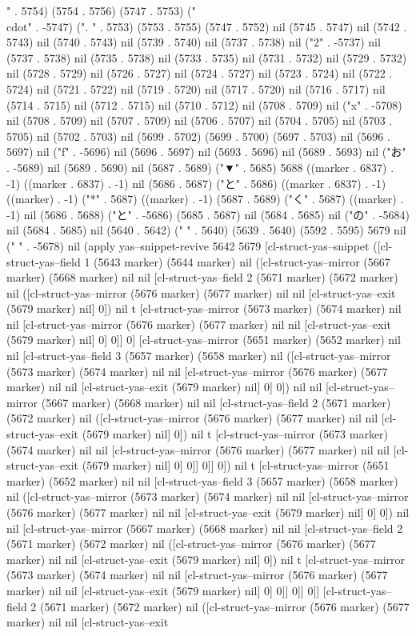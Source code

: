 " . 5754) (5754 . 5756) (5747 . 5753) ("\\cdot" . -5747) (".
" . 5753) (5753 . 5755) (5747 . 5752) nil (5745 . 5747) nil (5742 . 5743) nil (5740 . 5743) nil (5739 . 5740) nil (5737 . 5738) nil ("2" . -5737) nil (5737 . 5738) nil (5735 . 5738) nil (5733 . 5735) nil (5731 . 5732) nil (5729 . 5732) nil (5728 . 5729) nil (5726 . 5727) nil (5724 . 5727) nil (5723 . 5724) nil (5722 . 5724) nil (5721 . 5722) nil (5719 . 5720) nil (5717 . 5720) nil (5716 . 5717) nil (5714 . 5715) nil (5712 . 5715) nil (5710 . 5712) nil (5708 . 5709) nil ("x" . -5708) nil (5708 . 5709) nil (5707 . 5709) nil (5706 . 5707) nil (5704 . 5705) nil (5703 . 5705) nil (5702 . 5703) nil (5699 . 5702) (5699 . 5700) (5697 . 5703) nil (5696 . 5697) nil ("f" . -5696) nil (5696 . 5697) nil (5693 . 5696) nil (5689 . 5693) nil ("お" . -5689) nil (5689 . 5690) nil (5687 . 5689) ("▼" . 5685) 5688 ((marker . 6837) . -1) ((marker . 6837) . -1) nil (5686 . 5687) ("と" . 5686) ((marker . 6837) . -1) ((marker) . -1) ("*" . 5687) ((marker) . -1) (5687 . 5689) ("く" . 5687) ((marker) . -1) nil (5686 . 5688) ("と" . -5686) (5685 . 5687) nil (5684 . 5685) nil ("の" . -5684) nil (5684 . 5685) nil (5640 . 5642) (" " . 5640) (5639 . 5640) (5592 . 5595) 5679 nil (" " . -5678) nil (apply yas--snippet-revive 5642 5679 [cl-struct-yas--snippet ([cl-struct-yas--field 1 (5643 marker) (5644 marker) nil ([cl-struct-yas--mirror (5667 marker) (5668 marker) nil nil [cl-struct-yas--field 2 (5671 marker) (5672 marker) nil ([cl-struct-yas--mirror (5676 marker) (5677 marker) nil nil [cl-struct-yas--exit (5679 marker) nil] 0]) nil t [cl-struct-yas--mirror (5673 marker) (5674 marker) nil nil [cl-struct-yas--mirror (5676 marker) (5677 marker) nil nil [cl-struct-yas--exit (5679 marker) nil] 0] 0]] 0] [cl-struct-yas--mirror (5651 marker) (5652 marker) nil nil [cl-struct-yas--field 3 (5657 marker) (5658 marker) nil ([cl-struct-yas--mirror (5673 marker) (5674 marker) nil nil [cl-struct-yas--mirror (5676 marker) (5677 marker) nil nil [cl-struct-yas--exit (5679 marker) nil] 0] 0]) nil nil [cl-struct-yas--mirror (5667 marker) (5668 marker) nil nil [cl-struct-yas--field 2 (5671 marker) (5672 marker) nil ([cl-struct-yas--mirror (5676 marker) (5677 marker) nil nil [cl-struct-yas--exit (5679 marker) nil] 0]) nil t [cl-struct-yas--mirror (5673 marker) (5674 marker) nil nil [cl-struct-yas--mirror (5676 marker) (5677 marker) nil nil [cl-struct-yas--exit (5679 marker) nil] 0] 0]] 0]] 0]) nil t [cl-struct-yas--mirror (5651 marker) (5652 marker) nil nil [cl-struct-yas--field 3 (5657 marker) (5658 marker) nil ([cl-struct-yas--mirror (5673 marker) (5674 marker) nil nil [cl-struct-yas--mirror (5676 marker) (5677 marker) nil nil [cl-struct-yas--exit (5679 marker) nil] 0] 0]) nil nil [cl-struct-yas--mirror (5667 marker) (5668 marker) nil nil [cl-struct-yas--field 2 (5671 marker) (5672 marker) nil ([cl-struct-yas--mirror (5676 marker) (5677 marker) nil nil [cl-struct-yas--exit (5679 marker) nil] 0]) nil t [cl-struct-yas--mirror (5673 marker) (5674 marker) nil nil [cl-struct-yas--mirror (5676 marker) (5677 marker) nil nil [cl-struct-yas--exit (5679 marker) nil] 0] 0]] 0]] 0]] [cl-struct-yas--field 2 (5671 marker) (5672 marker) nil ([cl-struct-yas--mirror (5676 marker) (5677 marker) nil nil [cl-struct-yas--exit 